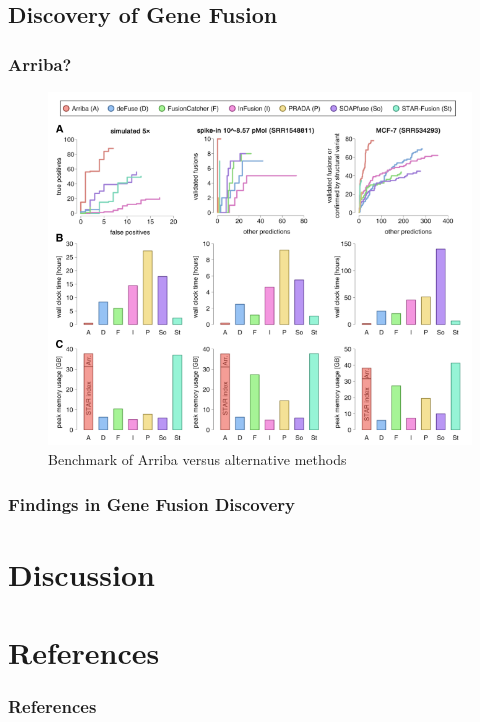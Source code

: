 \documentclass{beamer}
\begin{document}
    \subsection{Discovery of Gene Fusion}
    \begin{frame}
        \frametitle{Arriba?}

        \begin{figure}
            \includegraphics[width=0.6 \linewidth]{figures/Workflow/Arriba.png}
            \caption{Benchmark of Arriba versus alternative methods \protect\cite{Arriba1}}
        \end{figure}
    \end{frame}

    \begin{frame}
        \frametitle{Findings in Gene Fusion Discovery}
    \end{frame}

    \section{Discussion}

    \section{References}
    \begin{frame}[allowframebreaks]
        \frametitle{References}
        
        
    \end{frame}
\end{document}

